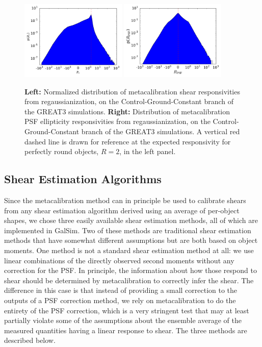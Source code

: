 \documentclass[iop]{emulateapj}
\begin{document}
\begin{figure}
\begin{center}
\includegraphics[width=0.45\textwidth]{R1_hist.pdf}
\includegraphics[width=0.45\textwidth]{a1_hist.pdf}
\end{center}
\caption{{\bf Left:} Normalized distribution of metacalibration shear
  responsivities from regaussianization, on the
  Control-Ground-Constant branch of the GREAT3 simulations.  {\bf
    Right:} Distribution of metacalibration PSF ellipticity
  responsivities from regaussianization, on the
  Control-Ground-Constant branch of the GREAT3 simulations. A
  vertical red dashed line is drawn for reference at the expected
  responsivity for perfectly round objects, $R=2$, in the left
  panel. }
\label{fig:calibhist}
\end{figure}


\subsection{Shear Estimation Algorithms}

Since the metacalibration method can in principle be used to calibrate
shears from any shear estimation algorithm derived using an average of per-object shapes, we chose three easily
available shear estimation methods, all of which are implemented in
GalSim.  Two of these methods are traditional shear estimation
methods that have somewhat different assumptions but are both based on
object moments.  One method is not a standard shear estimation method
at all: we use linear combinations of the directly observed second
moments without any correction for the PSF.  In principle, the
information about how those respond to shear should be determined by
metacalibration to correctly infer the shear.  The difference in this
case is that instead of providing a small correction to the outputs of
a PSF correction method, we rely on metacalibration to do the entirety
of the PSF correction, which is a very stringent test that may at least 
partially violate some of the assumptions about the ensemble average of the measured quantities having a linear
response to shear.  The three methods are described below.
\end{document}
